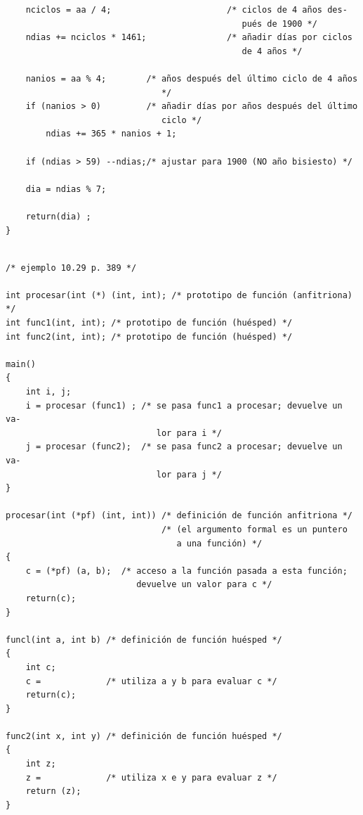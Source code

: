 \documentclass{article}
\begin{document}
\begin{verbatim}
    nciclos = aa / 4;                       /* ciclos de 4 años des-
                                               pués de 1900 */
    ndias += nciclos * 1461;                /* añadir días por ciclos 
                                               de 4 años */
    
    nanios = aa % 4;        /* años después del último ciclo de 4 años 
                               */
    if (nanios > 0)         /* añadir días por años después del último
                               ciclo */
        ndias += 365 * nanios + 1;

    if (ndias > 59) --ndias;/* ajustar para 1900 (NO año bisiesto) */
    
    dia = ndias % 7;
    
    return(dia) ;
}
\end{verbatim}

\begin{verbatim}

/* ejemplo 10.29 p. 389 */

int procesar(int (*) (int, int); /* prototipo de función (anfitriona) */
int func1(int, int); /* prototipo de función (huésped) */
int func2(int, int); /* prototipo de función (huésped) */

main()
{
    int i, j;
    i = procesar (func1) ; /* se pasa func1 a procesar; devuelve un va-
                              lor para i */
    j = procesar (func2);  /* se pasa func2 a procesar; devuelve un va-
                              lor para j */
}

procesar(int (*pf) (int, int)) /* definición de función anfitriona */
                               /* (el argumento formal es un puntero 
                                  a una función) */
{
    c = (*pf) (a, b);  /* acceso a la función pasada a esta función; 
                          devuelve un valor para c */
    return(c); 
}

funcl(int a, int b) /* definición de función huésped */
{
    int c;
    c =             /* utiliza a y b para evaluar c */
    return(c); 
}

func2(int x, int y) /* definición de función huésped */
{
    int z;
    z =             /* utiliza x e y para evaluar z */
    return (z);  
}
\end{verbatim}
\end{document}
